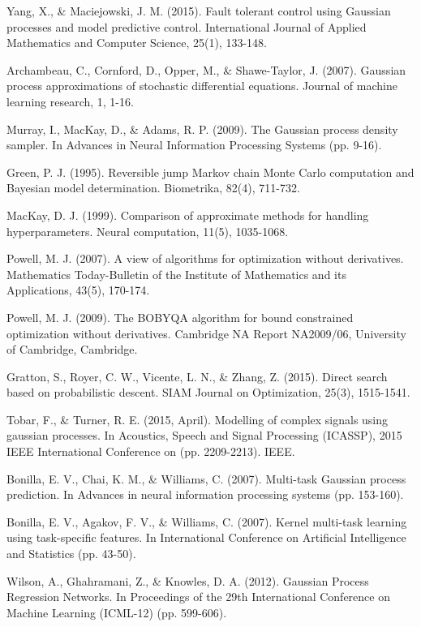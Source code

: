 \begin{thebibliography}{99}
 Yang, X., \& Maciejowski, J. M. (2015). Fault tolerant control
using Gaussian processes and model predictive control. International Journal
of Applied Mathematics and Computer Science, 25(1), 133-148.

 Archambeau, C., Cornford, D., Opper, M., \& Shawe-Taylor, J.
(2007). Gaussian process approximations of stochastic differential
equations. Journal of machine learning research, 1, 1-16.

 Murray, I., MacKay, D., \& Adams, R. P. (2009). The Gaussian
process density sampler. In Advances in Neural Information Processing
Systems (pp. 9-16).

 Green, P. J. (1995). Reversible jump Markov chain Monte Carlo
computation and Bayesian model determination. Biometrika, 82(4), 711-732.

 MacKay, D. J. (1999). Comparison of approximate methods for
handling hyperparameters. Neural computation, 11(5), 1035-1068.

 Powell, M. J. (2007). A view of algorithms for optimization
without derivatives. Mathematics Today-Bulletin of the Institute of
Mathematics and its Applications, 43(5), 170-174.

 Powell, M. J. (2009). The BOBYQA algorithm for bound
constrained optimization without derivatives. Cambridge NA Report NA2009/06,
University of Cambridge, Cambridge.

 Gratton, S., Royer, C. W., Vicente, L. N., \& Zhang, Z. (2015).
Direct search based on probabilistic descent. SIAM Journal on Optimization,
25(3), 1515-1541.

 Tobar, F., \& Turner, R. E. (2015, April). Modelling of complex
signals using gaussian processes. In Acoustics, Speech and Signal Processing
(ICASSP), 2015 IEEE International Conference on (pp. 2209-2213). IEEE.

 Bonilla, E. V., Chai, K. M., \& Williams, C. (2007). Multi-task
Gaussian process prediction. In Advances in neural information processing
systems (pp. 153-160).

 Bonilla, E. V., Agakov, F. V., \& Williams, C. (2007). Kernel
multi-task learning using task-specific features. In International
Conference on Artificial Intelligence and Statistics (pp. 43-50).

 Wilson, A., Ghahramani, Z., \& Knowles, D. A. (2012). Gaussian
Process Regression Networks. In Proceedings of the 29th International
Conference on Machine Learning (ICML-12) (pp. 599-606).


\end{thebibliography}
